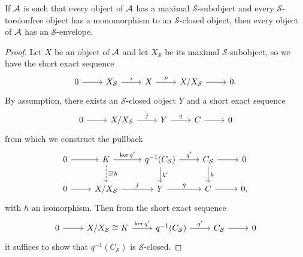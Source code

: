\documentclass[dissertation.tex]{subfiles}
\begin{document}
\begin{lem}\label{lem3}
  If $\mathcal{A}$ is such that every object of $\mathcal{A}$ has a maximal $\mathcal{S}$-subobject and every $\mathcal{S}$-torsionfree object has a monomorphism to an $\mathcal{S}$-closed object, then every object of $\mathcal{A}$ has an $\mathcal{S}$-envelope.
  \begin{proof}
    Let $X$ be an object of $\mathcal{A}$ and let $X_\mathcal{S}$ be its maximal $\mathcal{S}$-subobject, so we have the short exact sequence
    $$\begin{tikzcd}
      0 \arrow{r}& X_\mathcal{S} \arrow{r}{i} & X \arrow{r}{p} & X/X_\mathcal{S} \arrow{r} & 0.
    \end{tikzcd}$$
    By assumption, there exists an $\mathcal{S}$-closed object $Y$ and a short exact sequence
    $$\begin{tikzcd}
      0 \arrow{r} & X/X_\mathcal{S} \arrow{r}{j} & Y \arrow{r}{q} & C \arrow{r} & 0
    \end{tikzcd}$$
    from which we construct the pullback
    $$\begin{tikzcd}
      0 \arrow{r} & K \arrow[dashed]{d}{\exists !h}\arrow{r}{\ker{q^\prime}} & q^{-1}(C_\mathcal{S}) \arrow{r}{q^\prime} \arrow{d}{k^\prime} & C_\mathcal{S}\arrow{d}{k} \arrow{r}&0\\
      0 \arrow{r} & X/X_\mathcal{S} \arrow{r}{j} & Y \arrow{r}{q} & C \arrow{r} & 0,
    \end{tikzcd}$$
    with $h$ an isomorphism.
    Then from the short exact sequence 
    $$\begin{tikzcd}
      0 \arrow{r} & X/X_\mathcal{S} \cong K \arrow{r}{\ker{q^\prime}} & q^{-1}(C_\mathcal{S}) \arrow{r}{q^\prime} & C_\mathcal{S}\arrow{r} & 0
    \end{tikzcd}$$
    it suffices to show that $q^{-1}(C_\mathcal{S})$ is $\mathcal{S}$-closed.
    

\end{proof}
\end{lem}
\end{document}
